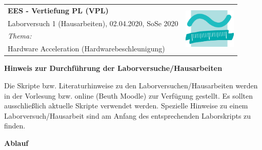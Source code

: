 \documentclass[addpoints,11pt]{exam}
\newcommand{\thislecture}{EES - Vertiefung PL (VPL)}
\newcommand{\thistheme}{Hardware Acceleration (Hardwarebeschleunigung)}
\newcommand{\thisexam}{Laborversuch 1 (Hausarbeiten)}
\newcommand{\thisdate}{02.04.2020}
\newcommand{\thissemester}{SoSe 2020}
\begin{document}
\begin{coverpages}
	
	\setlength{\parskip}{10pt}
	\setlength{\parindent}{0pt}
	
	\vspace{2cm}
	\normalsize
	\begin{tabularx}{\textwidth}{ p{13.75cm} | r }
	    \toprule
		\textbf{\thislecture}  & \multirow{4}{*}{\quad 
		\includegraphics[width=2.5cm]{BilderPDF/beuth}} \\
		\thisexam, \thisdate, \thissemester &  \\
		\cline{1-1}
		\emph{Thema:}  & \\
		\thistheme &  \\
		\bottomrule
	\end{tabularx}
	
	\vspace{2cm}
	\LARGE\textbf{Hinweis zur Durchführung der Laborversuche/Hausarbeiten}
	
\normalsize
Die Skripte bzw. Literaturhinweise zu den Laborversuchen/Hausarbeiten werden in der Vorlesung bzw. online (Beuth Moodle) zur
Verfügung gestellt. Es sollten ausschlie\ss lich aktuelle Skripte verwendet werden. Spezielle Hinweise
zu einem Laborversuch/Hausarbeit sind am Anfang des entsprechenden Laborskripts zu finden.
	
\textbf{Ablauf}


\end{coverpages}
\end{document}
